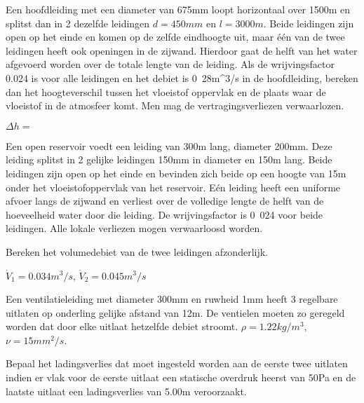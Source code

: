 \begin{toepassing*}
	\label{hoogteverschil}
Een hoofdleiding met een diameter van \unit{675}{mm} loopt horizontaal over \unit{1500}{m} en splitst dan in 2 dezelfde leidingen $d=\unit{450}{mm}$ en $l=\unit{3000}{m}$. Beide leidingen zijn open op het einde en komen op de zelfde eindhoogte uit, maar één van de twee leidingen heeft ook openingen in de zijwand. Hierdoor gaat de helft van het water afgevoerd worden over de totale lengte van de leiding.
	Als de wrijvingsfactor 0.024 is voor alle leidingen en het debiet is \unit{0.28}{m^3/s} in de hoofdleiding, bereken dan het hoogteverschil tussen het vloeistof oppervlak en de plaats waar de vloeistof in de atmosfeer komt. Men mag de vertragingsverliezen verwaarlozen.
\end{toepassing*}
\begin{antwoord}
	$\Delta h = $
\end{antwoord}
\begin{toepassing}
	\label{geperforeerde leiding}
Een open reservoir voedt een leiding van \unit{300}{m} lang, diameter \unit{200}{mm}. Deze leiding splitst in 2 gelijke leidingen \unit{150}{mm} in diameter en \unit{150}{m} lang. Beide leidingen zijn open op het einde en bevinden zich beide op een hoogte van \unit{15}{m} onder het vloeistofoppervlak van het reservoir. E\'en leiding heeft een uniforme afvoer langs de zijwand en verliest over de volledige lengte de helft van de hoeveelheid water door die leiding. De wrijvingsfactor is \unit{0.024}{} voor beide leidingen. Alle lokale verliezen mogen verwaarloosd worden.
		
	Bereken het volumedebiet van de twee leidingen afzonderlijk. 
\end{toepassing}
\begin{antwoord}
	$\dot{V}_1 = \unit{0.034}{m^3/s}$, $\dot{V}_2 = \unit{0.045}{m^3/s}$
\end{antwoord}
\begin{toepassing}
	\label{3uitlaten}
Een ventilatieleiding met diameter 300mm en ruwheid 1mm heeft 3 regelbare uitlaten op onderling gelijke afstand van 12m. De ventielen moeten zo geregeld worden dat door elke uitlaat hetzelfde debiet stroomt. $\rho = \unit{1.22}{kg/m^3}$, $\nu = \unit{15}{mm^2/s}$.
	
	Bepaal het ladingsverlies dat moet ingesteld worden aan de eerste twee uitlaten indien er vlak voor de eerste uitlaat een statische overdruk heerst van 50Pa en de laatste uitlaat een ladingsverlies van 5.00m veroorzaakt.
	\begin{center}
		
	\end{center}
\end{toepassing}
